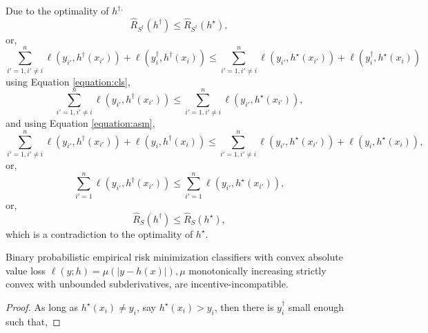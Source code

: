 \documentclass{article}
\begin{document}
Due to the optimality of $h^{\dagger,}$
\begin{equation} 
\hat{R}_{S^{\dagger}}\left(h^{\dagger}\right) \leq  \hat{R}_{S^{\dagger}}\left(h^\star \right),
\end{equation}
or,
\begin{equation} 
\displaystyle\sum_{i'=1, i' \neq  i}^{n} \ell\left(y_{i'}, h^{\dagger}\left(x_{i'}\right)\right) + \ell\left(y^{\dagger}_{i}, h^{\dagger}\left(x_{i}\right)\right) \leq  \displaystyle\sum_{i'=1, i' \neq  i}^{n} \ell\left(y_{i'}, h^\star \left(x_{i'}\right)\right) + \ell\left(y^{\dagger}_{i}, h^\star \left(x_{i}\right)\right)
\end{equation}
using Equation \ref{equation:cls},
\begin{equation} 
\displaystyle\sum_{i'=1, i' \neq  i}^{n} \ell\left(y_{i'}, h^{\dagger}\left(x_{i'}\right)\right) \leq  \displaystyle\sum_{i'=1, i' \neq  i}^{n} \ell\left(y_{i'}, h^\star \left(x_{i'}\right)\right),
\end{equation}
and using Equation \ref{equation:asm},
\begin{equation} 
\displaystyle\sum_{i'=1, i' \neq  i}^{n} \ell\left(y_{i'}, h^{\dagger}\left(x_{i'}\right)\right) + \ell\left(y_{i}, h^{\dagger}\left(x_{i}\right)\right) \leq  \displaystyle\sum_{i'=1, i' \neq  i}^{n} \ell\left(y_{i'}, h^\star \left(x_{i'}\right)\right) + \ell\left(y_{i}, h^\star \left(x_{i}\right)\right),
\end{equation}
or,
\begin{equation} 
\displaystyle\sum_{i'=1}^{n} \ell\left(y_{i'}, h^{\dagger}\left(x_{i'}\right)\right) \leq  \displaystyle\sum_{i'=1}^{n} \ell\left(y_{i'}, h^\star \left(x_{i'}\right)\right),
\end{equation}
or,
\begin{equation} 
\hat{R}_{S}\left(h^{\dagger}\right) \leq  \hat{R}_{S}\left(h^\star \right),
\end{equation}
which is a contradiction to the optimality of $h^\star $.
\newline \newline
\begin{prop} \label{prop:dfpmu} 
Binary probabilistic empirical risk minimization classifiers with convex absolute value loss $\ell\left(y ; h\right) = \mu\left(\left| y - h\left(x\right) \right|\right), \mu$ monotonically increasing strictly convex with unbounded subderivatives, are incentive-incompatible.
\end{prop}
\begin{proof} \label{proof:dfpmupf} 
As long as $h^\star \left(x_{i}\right) \neq  y_{i}$, say $h^\star \left(x_{i}\right) > y_{i}$, then there is $y^{\dagger}_{i}$ small enough such that,
\end{proof}
\end{document}
